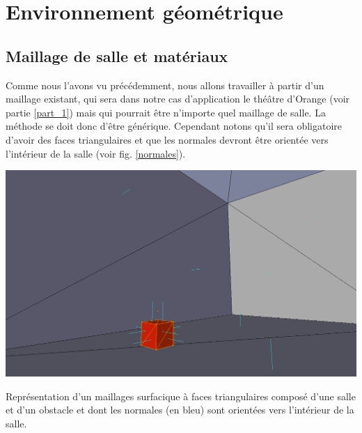 \section{Environnement géométrique}

\subsection{Maillage de salle et matériaux} \label{sect_lectMat}

Comme nous l'avons vu précédemment, nous allons travailler à partir d'un maillage existant, qui sera dans notre cas d'application le théâtre d'Orange (voir partie \ref{part_1}) mais qui pourrait être n'importe quel maillage de salle. La méthode se doit donc d'être générique. Cependant notons qu'il sera obligatoire d'avoir des faces triangulaires et que les normales devront être orientée vers l'intérieur de la salle (voir fig. \ref{normales}).

\begin{figureth}
	\includegraphics[width=0.8\linewidth]{images/normales}
	\caption{Représentation d'un maillages surfacique à faces triangulaires composé d'une salle et d'un obstacle et dont les normales (en bleu) sont orientées vers l'intérieur de la salle.}
	\label{normales}
\end{figureth}

